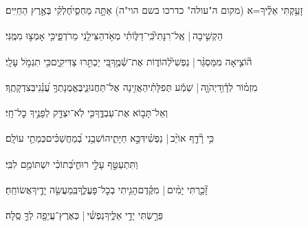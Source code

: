 \documentclass[12pt]{article}
\newcommand{\loc}[1]{\textsuperscript{\locf{#1}}}
\begin{document}
{\loc{ ו}~}‏זָעַ֥קְתִּי אֵלֶ֗יךָ{\hfill}=א (מקום ה"עולה" כדרכו בשם הוי"ה)\newline\hspace*{.5em} אַתָּ֣ה מַחְסִ֑י{\hfill}חֶ֝לְקִ֗י בְּאֶ֣רֶץ הַחַיִּֽים׃\par

{\loc{ ז}~}‏הַקְשִׁ֤יבָה |  אֶֽל־רִנָּתִי֮{\hfill}כִּֽי־דַלּ֢וֹתִ֫י מְאֹ֥ד\newline\hspace*{.5em}הַצִּילֵ֥נִי מֵרֹדְפַ֑י{\hfill}כִּ֖י אָמְצ֣וּ מִמֶּֽנִּי׃\par

{\loc{ ח}~}‏ה֘וֹצִ֤יאָה מִמַּסְגֵּ֨ר |  נַפְשִׁי֮{\hfill}לְהוֹד֢וֹת אֶת־שְׁ֫מֶ֥ךָ\newline\hspace*{.5em}בִּ֭י יַכְתִּ֣רוּ צַדִּיקִ֑ים{\hfill}כִּ֖י תִגְמֹ֣ל עָלָֽי׃\par\pend
\ledpb
\pstart[\subsection*{\textcolor{red}{פרק קמג}}]\label{פרק קמג}
{\loc{ א}~}‏מִזְמ֗וֹר לְדָ֫וִ֥ד\newline\hspace*{.5em}יְהֹוָ֤ה |  שְׁמַ֬ע תְּפִלָּתִ֗י{\hfill}הַאֲזִ֥ינָה אֶל־תַּחֲנוּנַ֑י\newline\hspace*{.5em}בֶּאֱמֻנָתְךָ֥ עֲ֝נֵ֗נִי{\hfill}בְּצִדְקָתֶֽךָ׃\par

{\loc{ ב}~}‏וְאַל־תָּב֣וֹא  אֶת־עַבְדֶּ֑ךָ{\hfill}כִּ֤י לֹֽא־יִצְדַּ֖ק לְפָנֶ֣יךָ כׇל־חָֽי׃\par

{\loc{ ג}~}‏כִּ֥י רָ֘דַ֤ף אוֹיֵ֨ב |  נַפְשִׁ֗י{\hfill}דִּכָּ֣א  חַיָּתִ֑י\newline\hspace*{.5em}הוֹשִׁבַ֥נִי בְ֝מַחֲשַׁכִּ֗ים{\hfill}כְּמֵתֵ֥י עוֹלָֽם׃\par

{\loc{ ד}~}‏וַתִּתְעַטֵּ֣ף עָלַ֣י רוּחִ֑י{\hfill}בְּ֝תוֹכִ֗י יִשְׁתּוֹמֵ֥ם לִבִּֽי׃\par

{\loc{ ה}~}‏זָ֘כַ֤רְתִּי יָמִ֨ים |  מִקֶּ֗דֶם{\hfill}הָגִ֥יתִי בְכׇל־פָּעֳלֶ֑ךָ\newline\hspace*{.5em}בְּֽמַעֲשֵׂ֖ה יָדֶ֣יךָ{\hfill}אֲשׂוֹחֵֽחַ׃\par

{\loc{ ו}~}‏פֵּרַ֣שְׂתִּי יָדַ֣י אֵלֶ֑יךָ{\hfill}נַפְשִׁ֓י |  כְּאֶרֶץ־עֲיֵפָ֖ה לְךָ֣ סֶֽלָה׃\par
\end{document}
